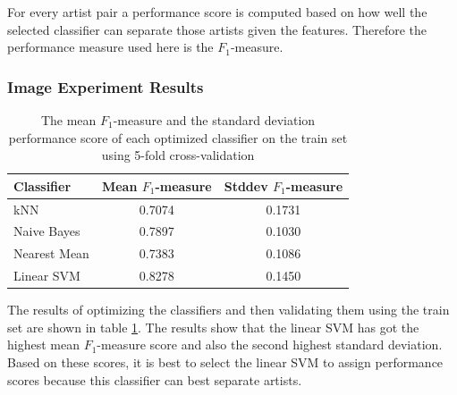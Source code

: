 For every artist pair a performance score is computed based on how well the selected classifier can separate those artists given the features.
Therefore the performance measure used here is the $F_1$-measure.

%
%

\subsubsection{Image Experiment Results}

\begin{table}[htb]
    \centering
    \begin{tabular}
        { | l | c | c |} 
        \hline
        Classifier & Mean $F_1$-measure & Stddev $F_1$-measure  \\
        \hline
        kNN & 0.7074 & 0.1731 \\ 
        Naive Bayes & 0.7897 & 0.1030 \\ 
        Nearest Mean & 0.7383 & 0.1086 \\ 
        Linear SVM & 0.8278 & 0.1450 \\ 
        \hline 
    \end{tabular}
    \caption{The mean $F_1$-measure and the standard deviation performance score of each optimized classifier on the train set using 5-fold cross-validation}
    \label{ex2optimizeresults}
\end{table}

The results of optimizing the classifiers and then validating them using the train set are shown in table \ref{ex2optimizeresults}.
The results show that the linear SVM has got the highest mean $F_1$-measure score and also the second highest standard deviation.
Based on these scores, it is best to select the linear SVM to assign performance scores because this classifier can best separate artists.

